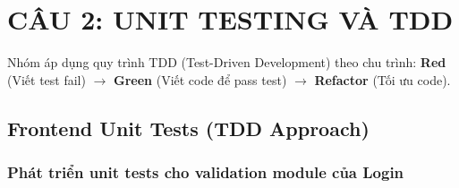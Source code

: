 \documentclass[a4paper,12pt]{article}
\begin{document}
\section{CÂU 2: UNIT TESTING VÀ TDD}
Nhóm áp dụng quy trình TDD (Test-Driven Development) theo chu trình: \textbf{Red} (Viết test fail) $\rightarrow$ \textbf{Green} (Viết code để pass test) $\rightarrow$ \textbf{Refactor} (Tối ưu code).

\subsection{Frontend Unit Tests (TDD Approach)}

\subsubsection{Phát triển unit tests cho validation module của Login}
\end{document}
